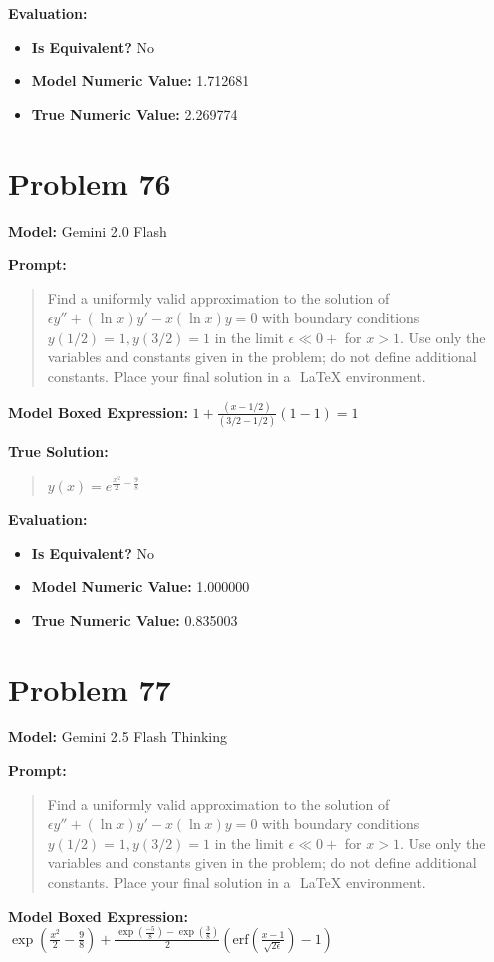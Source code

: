 \documentclass{article}
\begin{document}
{\textbf{Evaluation:}
\begin{itemize}
\item \textbf{Is Equivalent?} No
\item \textbf{Model Numeric Value:} 1.712681
\item \textbf{True Numeric Value:} 2.269774
\end{itemize}
\vspace{1cm}
\section*{Problem 76}
\textbf{Model:} Gemini 2.0 Flash

\textbf{Prompt:}
\begin{quote}
Find a uniformly valid approximation to the solution of $\epsilon y'' + (\ln x) y' - x(\ln x) y = 0$ with boundary conditions $y(1/2)=1, y(3/2)=1$ in the limit $\epsilon \ll 0+$ for $x>1$. Use only the variables and constants given in the problem; do not define additional constants. Place your final solution in a $\boxed{}$ LaTeX environment.
\end{quote}
\textbf{Model Boxed Expression:} $1 + \frac{(x-1/2)}{(3/2 - 1/2)}(1-1) = 1$

\textbf{True Solution:}
\begin{quote}
$y(x) = e^{\frac{x^2}{2} - \frac{9}{8}}$
\end{quote}

\textbf{Evaluation:}
\begin{itemize}
\item \textbf{Is Equivalent?} No
\item \textbf{Model Numeric Value:} 1.000000
\item \textbf{True Numeric Value:} 0.835003
\end{itemize}
\vspace{1cm}
\section*{Problem 77}
\textbf{Model:} Gemini 2.5 Flash Thinking

\textbf{Prompt:}
\begin{quote}
Find a uniformly valid approximation to the solution of $\epsilon y'' + (\ln x) y' - x(\ln x) y = 0$ with boundary conditions $y(1/2)=1, y(3/2)=1$ in the limit $\epsilon \ll 0+$ for $x>1$. Use only the variables and constants given in the problem; do not define additional constants. Place your final solution in a $\boxed{}$ LaTeX environment.
\end{quote}
\textbf{Model Boxed Expression:} $\exp\left(\frac{x^2}{2} - \frac{9}{8}\right) + \frac{\exp\left(\frac{-5}{8}\right) - \exp\left(\frac{3}{8}\right)}{2} \left( \text{erf}\left(\frac{x-1}{\sqrt{2\epsilon}}\right) - 1 \right)$

}
\end{document}
